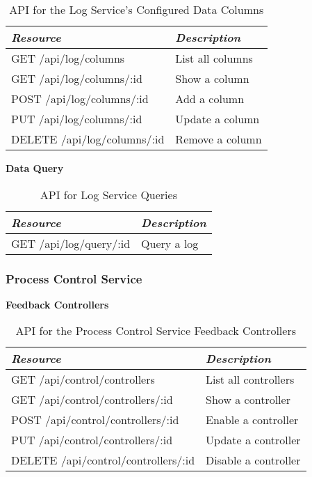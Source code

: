       \begin{table}[H]
        \centering
        \begin{tabular}{p{8cm} p{10cm}}
          \toprule
          \emph{Resource} & \emph{Description} \\ [0.5ex]
          \midrule
          GET /api/log/columns & List all columns \\
          GET /api/log/columns/:id & Show a column \\
          POST /api/log/columns/:id & Add a column \\
          PUT /api/log/columns/:id & Update a column \\
          DELETE /api/log/columns/:id & Remove a column \\
          \bottomrule
        \end{tabular}
        \caption{API for the Log Service's Configured Data Columns}\label{tab:rest-log-columns}
      \end{table}

      \large{\textbf{Data Query}}

      \begin{table}[H]
        \centering
        \begin{tabular}{p{8cm} p{10cm}}
          \toprule
          \emph{Resource} & \emph{Description} \\ [0.5ex]
          \midrule
          GET /api/log/query/:id & Query a log \\
          \bottomrule
        \end{tabular}
        \caption{API for Log Service Queries}\label{tab:rest-log-query}
      \end{table}

    \subsubsection{Process Control Service}\label{sec:rest-control}

      \large{\textbf{Feedback Controllers}}

      \begin{table}[H]
        \centering
        \begin{tabular}{p{8cm} p{10cm}}
          \toprule
          \emph{Resource} & \emph{Description} \\ [0.5ex]
          \midrule
          GET /api/control/controllers & List all controllers \\
          GET /api/control/controllers/:id & Show a controller \\
          POST /api/control/controllers/:id & Enable a controller \\
          PUT /api/control/controllers/:id & Update a controller \\
          DELETE /api/control/controllers/:id & Disable a controller \\
          \bottomrule
        \end{tabular}
        \caption{API for the Process Control Service Feedback Controllers}\label{tab:rest-control-controllers}
      \end{table}
